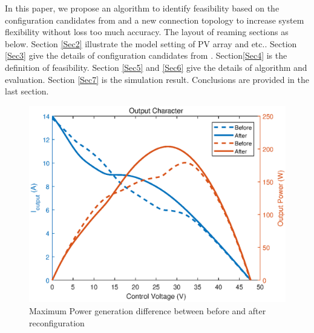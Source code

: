 \documentclass[conference]{IEEEtran}
\begin{document}
In this paper, we propose an algorithm to identify feasibility based on the configuration candidates from \cite{orozco2016optimized} and a new connection topology to increase system flexibility without loss too much accuracy. The layout of reaming sections as below. Section \ref{Sec2} illustrate the model setting of PV array and etc.. Section \ref{Sec3} give the details of configuration candidates from \cite{orozco2016optimized}. Section\ref{Sec4} is the definition of feasibility. Section \ref{Sec5} and \ref{Sec6} give the details of algorithm and evaluation. Section \ref{Sec7} is the simulation result. Conclusions are provided in the last section.
\begin{figure}
    \centering
    \includegraphics[width=0.8\linewidth]{compare.eps}
    \caption{Maximum Power generation difference between before and after reconfiguration}
    \label{compare}
\end{figure}
\end{document}
